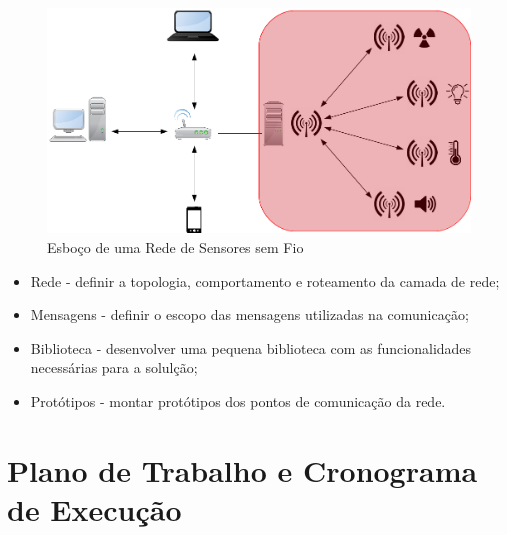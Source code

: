 \documentclass[
    12pt,               %
    a4paper,            %
    english,            %
    brazil,             %
    ]{article}
\begin{document}
	\begin{figure}
		\centering
		\includegraphics[width=\textwidth]{images/wsn.png}
		\caption{Esboço de uma Rede de Sensores sem Fio}
		\label{wsn}
	\end{figure}

	\begin{itemize}
		\item Rede - definir a topologia, comportamento e roteamento da camada de rede;
		\item Mensagens - definir o escopo das mensagens utilizadas na comunicação;
		\item Biblioteca - desenvolver uma pequena biblioteca com as funcionalidades necessárias para a solulção;
		\item Protótipos - montar protótipos dos pontos de comunicação da rede.
	\end{itemize}


\section{Plano de Trabalho e Cronograma de Execução}




\end{document}
